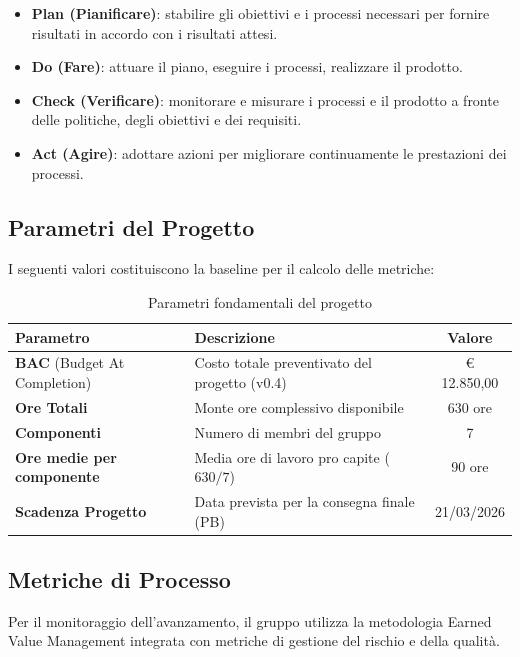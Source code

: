 \documentclass[a4paper,11pt,oneside]{scrartcl}
\begin{document}
\begin{itemize}
    \item \textbf{Plan (Pianificare)}: stabilire gli obiettivi e i processi necessari per fornire risultati in accordo con i risultati attesi.
    \item \textbf{Do (Fare)}: attuare il piano, eseguire i processi, realizzare il prodotto.
    \item \textbf{Check (Verificare)}: monitorare e misurare i processi e il prodotto a fronte delle politiche, degli obiettivi e dei requisiti.
    \item \textbf{Act (Agire)}: adottare azioni per migliorare continuamente le prestazioni dei processi.
\end{itemize}

\subsection{Parametri del Progetto}
I seguenti valori costituiscono la baseline{\scriptsize{}} per il calcolo delle metriche:

\begin{table}[h!]
\centering
\renewcommand{\arraystretch}{1.3}
\begin{tabularx}{\textwidth}{lXc}
\toprule
\textbf{Parametro} & \textbf{Descrizione} & \textbf{Valore} \\
\midrule
\textbf{BAC} (Budget At Completion) & Costo totale preventivato del progetto (v0.4) & € 12.850,00 \\
\textbf{Ore Totali} & Monte ore complessivo disponibile & 630 ore \\
\textbf{Componenti} & Numero di membri del gruppo & 7 \\
\textbf{Ore medie per componente} & Media ore di lavoro pro capite ($630/7$) & 90 ore \\
\textbf{Scadenza Progetto} & Data prevista per la consegna finale (PB{\scriptsize\raisebox{-0.5ex}{G}}) & 21/03/2026 \\
\bottomrule
\end{tabularx}
\caption{Parametri fondamentali del progetto}
\end{table}


\subsection{Metriche di Processo}
Per il monitoraggio dell'avanzamento, il gruppo utilizza la metodologia Earned Value Management{\scriptsize{}} integrata con metriche di gestione del rischio e della qualità.
\end{document}
